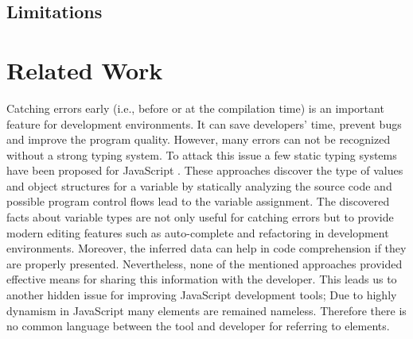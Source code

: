 \documentclass[10pt, preprint]{sigplanconf}
\begin{document}
\subsection{Limitations}

\section{Related Work}



Catching errors early (i.e., before or at the compilation time) is an important feature for development environments. It can save developers' time, prevent bugs and improve the program quality. However, many errors can not be recognized without a strong typing system. To attack this issue a few static typing systems have been proposed for JavaScript \cite{Anderson, Anderson2, Heidegger, Thiemann}. These approaches discover the type of values and object structures for a variable by statically analyzing the source code and possible program control flows lead to the variable assignment. The discovered facts about variable types are not only useful for catching errors but to provide modern editing features such as auto-complete and refactoring in development environments. Moreover, the inferred data can help in code comprehension if they are properly presented. Nevertheless, none of the mentioned approaches provided effective means for sharing this information with the developer. This leads us to another hidden issue for improving JavaScript development tools; Due to highly dynamism in JavaScript many elements are remained nameless. Therefore there is no common language between the tool and developer for referring to elements.
\end{document}
